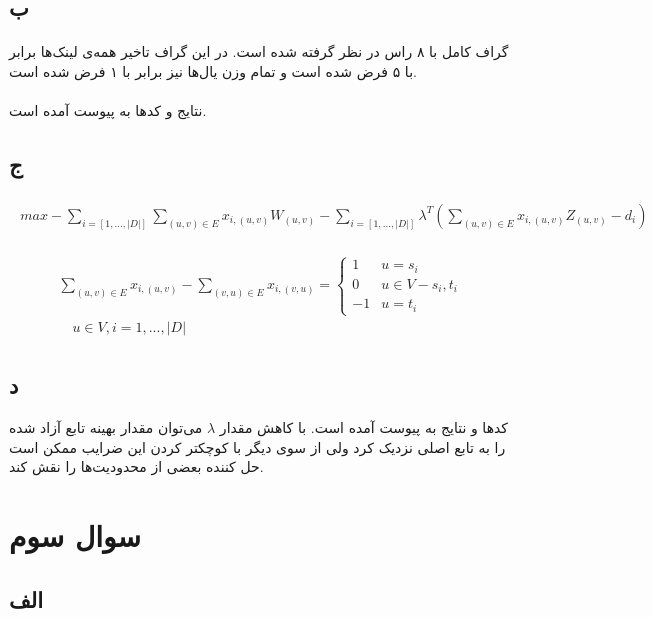 \documentclass[paper=a4, fontsize=11pt]{article}
\numberwithin{equation}{section} %
\numberwithin{figure}{section} %
\numberwithin{table}{section} %
\begin{document}
\subsection{ب}
\paragraph{}
گراف کامل با ۸ راس در نظر گرفته شده است. در این گراف تاخیر همه‌ی لینک‌ها برابر با ۵ فرض شده است و تمام وزن یال‌ها نیز برابر با ۱ فرض شده است.
\paragraph{}
نتایج و کدها به پیوست آمده است.

\subsection{ج}
\begin{align}
\begin{split}
	max -\sum_{i = [1, ..., |D|]}\sum_{(u,v) \in E} x_{i,(u,v)}W_{(u,v)} - \sum_{i = [1, ..., |D|]}\lambda^T(\sum_{(u,v) \in E} x_{i,(u,v)}Z_{(u,v)} - d_i)
\end{split}
\end{align}

\begin{align}
\begin{split}
	\sum_{(u,v) \in E} x_{i,(u,v)} - \sum_{(v,u) \in E} x_{i,(v,u)} = 
	\left \{
		\begin{array}{cc}
			1 & u = s_i\\
			0 & u \in V - {s_i, t_i}\\
			-1 & u = t_i
		\end{array}
	\right.
	\\
	\quad u \in V, i = {1, ..., |D|}
\end{split}
\end{align}

\subsection{د}
کدها و نتایج به پیوست آمده است.
با کاهش مقدار $\lambda$ می‌توان مقدار بهینه تابع آزاد شده را
به تابع اصلی نزدیک کرد ولی از سوی دیگر با کوچکتر کردن این ضرایب
ممکن است حل کننده بعضی از محدودیت‌ها را نقش کند.

\section{سوال سوم}
\subsection{الف}
\end{document}
